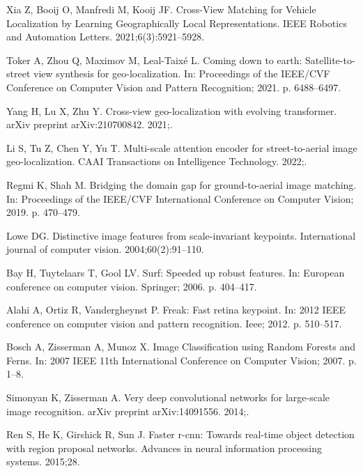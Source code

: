 \documentclass[10pt,letterpaper]{article}
\begin{document}
\begin{thebibliography}{10}
  Xia Z, Booij O, Manfredi M, Kooij JF.
  \newblock Cross-View Matching for Vehicle Localization by Learning
    Geographically Local Representations.
  \newblock IEEE Robotics and Automation Letters. 2021;6(3):5921--5928.
  
  Toker A, Zhou Q, Maximov M, Leal-Taix{\'e} L.
  \newblock Coming down to earth: Satellite-to-street view synthesis for
    geo-localization.
  \newblock In: Proceedings of the IEEE/CVF Conference on Computer Vision and
    Pattern Recognition; 2021. p. 6488--6497.
  
  Yang H, Lu X, Zhu Y.
  \newblock Cross-view geo-localization with evolving transformer.
  \newblock arXiv preprint arXiv:210700842. 2021;.
  
  Li S, Tu Z, Chen Y, Yu T.
  \newblock Multi-scale attention encoder for street-to-aerial image
    geo-localization.
  \newblock CAAI Transactions on Intelligence Technology. 2022;.
  
  Regmi K, Shah M.
  \newblock Bridging the domain gap for ground-to-aerial image matching.
  \newblock In: Proceedings of the IEEE/CVF International Conference on Computer
    Vision; 2019. p. 470--479.
  
  Lowe DG.
  \newblock Distinctive image features from scale-invariant keypoints.
  \newblock International journal of computer vision. 2004;60(2):91--110.
  
  Bay H, Tuytelaars T, Gool LV.
  \newblock Surf: Speeded up robust features.
  \newblock In: European conference on computer vision. Springer; 2006. p.
    404--417.
  
  Alahi A, Ortiz R, Vandergheynst P.
  \newblock Freak: Fast retina keypoint.
  \newblock In: 2012 IEEE conference on computer vision and pattern recognition.
    Ieee; 2012. p. 510--517.
  
  Bosch A, Zisserman A, Munoz X.
  \newblock Image Classification using Random Forests and Ferns.
  \newblock In: 2007 IEEE 11th International Conference on Computer Vision; 2007.
    p. 1--8.
  
  Simonyan K, Zisserman A.
  \newblock Very deep convolutional networks for large-scale image recognition.
  \newblock arXiv preprint arXiv:14091556. 2014;.
  
  Ren S, He K, Girshick R, Sun J.
  \newblock Faster r-cnn: Towards real-time object detection with region proposal
    networks.
  \newblock Advances in neural information processing systems. 2015;28.
  

\end{thebibliography}
\end{document}
